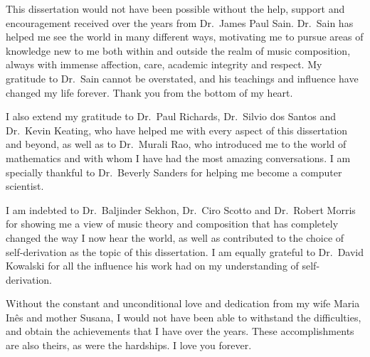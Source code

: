 This dissertation would not have been possible without the help, support and encouragement received over the years from Dr.~James Paul Sain. Dr.~Sain has helped me see the world in many different ways, motivating me to pursue areas of knowledge new to me both within and outside the realm of music composition, always with immense affection, care, academic integrity and respect. My gratitude to Dr.~Sain cannot be overstated, and his teachings and influence have changed my life forever. Thank you from the bottom of my heart.

I also extend my gratitude to Dr.~Paul Richards, Dr.~Silvio dos Santos and Dr.~Kevin Keating, who have helped me with every aspect of this dissertation and beyond, as well as to Dr.~Murali Rao, who introduced me to the world of mathematics and with whom I have had the most amazing conversations. I am specially thankful to Dr.~Beverly Sanders for helping me become a computer scientist.

I am indebted to Dr.~Baljinder Sekhon, Dr.~Ciro Scotto and Dr.~Robert Morris for showing me a view of music theory and composition that has completely changed the way I now hear the world, as well as contributed to the choice of self-derivation as the topic of this dissertation. I am equally grateful to Dr.~David Kowalski for all the influence his work had on my understanding of self-derivation. %

Without the constant and unconditional love and dedication from my wife Maria In\^{e}s and mother Susana, I would not have been able to withstand the difficulties, and obtain the achievements that I have over the years. These accomplishments are also theirs, as were the hardships. I love you forever.